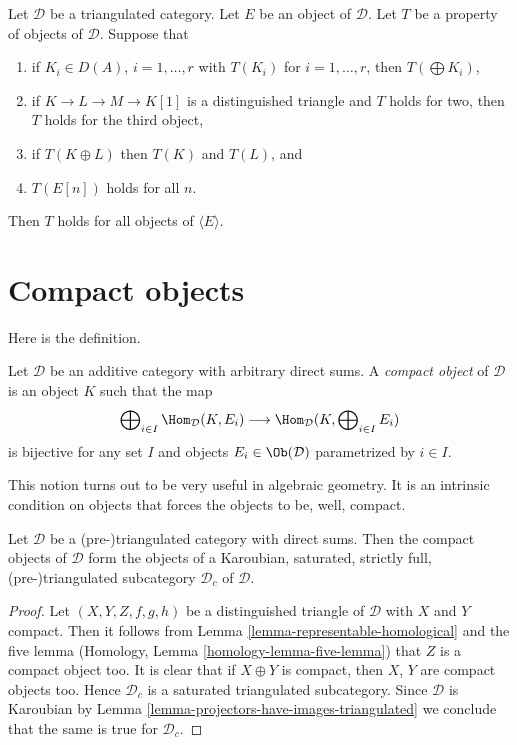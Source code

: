 \begin{remark}
\label{remark-check-on-generator}
Let $\mathcal{D}$ be a triangulated category. Let $E$ be an object
of $\mathcal{D}$. Let $T$ be a property of objects of $\mathcal{D}$.
Suppose that
\begin{enumerate}
\item if $K_i \in D(A)$, $i = 1, \ldots, r$ with
$T(K_i)$ for $i = 1, \ldots, r$, then $T(\bigoplus K_i)$,
\item if $K \to L \to M \to K[1]$ is a distinguished triangle and
$T$ holds for two, then $T$ holds for the third object,
\item if $T(K \oplus L)$ then $T(K)$ and $T(L)$, and
\item $T(E[n])$ holds for all $n$.
\end{enumerate}
Then $T$ holds for all objects of $\langle E \rangle$.
\end{remark}



\section{Compact objects}
\label{section-compact}

\noindent
Here is the definition.

\begin{definition}
\label{definition-compact-object}
Let $\mathcal{D}$ be an additive category with arbitrary direct
sums. A {\it compact object} of $\mathcal{D}$ is an object $K$
such that the map
$$
\bigoplus\nolimits_{i \in I} \Hom_{\mathcal{D}}(K, E_i)
\longrightarrow
\Hom_{\mathcal{D}}(K, \bigoplus\nolimits_{i \in I} E_i)
$$
is bijective for any set $I$ and objects
$E_i \in \Ob(\mathcal{D})$ parametrized by $i \in I$.
\end{definition}

\noindent
This notion turns out to be very useful in algebraic geometry.
It is an intrinsic condition on objects that forces the objects
to be, well, compact.

\begin{lemma}
\label{lemma-compact-objects-subcategory}
Let $\mathcal{D}$ be a (pre-)triangulated category with direct sums.
Then the compact objects of $\mathcal{D}$ form the objects of a
Karoubian, saturated, strictly full, (pre-)triangulated subcategory
$\mathcal{D}_c$ of $\mathcal{D}$.
\end{lemma}

\begin{proof}
Let $(X, Y, Z, f, g, h)$ be a distinguished triangle of $\mathcal{D}$
with $X$ and $Y$ compact. Then it follows from
Lemma \ref{lemma-representable-homological}
and the five lemma
(Homology, Lemma \ref{homology-lemma-five-lemma})
that $Z$ is a compact object too. It is clear that if $X \oplus Y$
is compact, then $X$, $Y$ are compact objects too. Hence
$\mathcal{D}_c$ is a saturated triangulated subcategory.
Since $\mathcal{D}$ is Karoubian by
Lemma \ref{lemma-projectors-have-images-triangulated}
we conclude that the same is true for $\mathcal{D}_c$.
\end{proof}

